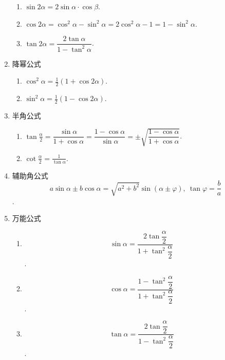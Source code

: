 \begin{enumerate}
	\begin{enumerate}
		\item \( \sin 2\alpha = 2\sin\alpha \cdot \cos \beta \).
		\item \( \cos2\alpha = \cos^{2}\alpha - \sin^{2}\alpha = 2\cos^{2}\alpha - 1 = 1 - \sin^{2}\alpha \).
		\item \( \displaystyle\tan2\alpha = \dfrac{2\tan\alpha}{1 - \tan^{2}\alpha} \).
	\end{enumerate}
	\item 降幂公式
	\begin{enumerate}
		\item \( \cos^{2}\alpha = \frac{1}{2}(1 + \cos2\alpha) \).
		\item \( \sin^{2}\alpha = \frac{1}{2}(1 - \cos2\alpha) \).
	\end{enumerate}
	\item 半角公式
	\begin{enumerate}
		\item \( \tan\frac{\alpha}{2} = \dfrac{\sin\alpha}{1 + \cos\alpha} = \dfrac{1 - \cos\alpha}{\sin\alpha} = \pm \sqrt{\dfrac{1 - \cos\alpha}{1 + \cos\alpha}} \).
		\item \( \displaystyle \cot\frac{\alpha}{2} = \frac{1}{\tan\alpha} \).
	\end{enumerate}
	\item 辅助角公式
	\[  a\sin\alpha \pm b\cos\alpha = \sqrt{a^{2} + b^{2}}\sin(\alpha \pm \varphi),\ \tan\varphi = \frac{b}{a}\].
	\item 万能公式
	\begin{enumerate}
		\item \[ \sin\alpha = \dfrac{2\tan\dfrac{\alpha}{2}}{1 + \tan^{2}\dfrac{\alpha}{2}} \].
		\item \[ \cos\alpha = \dfrac{1 - \tan^{2}\dfrac{\alpha}{2}}{1 + \tan^{2}\dfrac{\alpha}{2}} \].
		\item \[ \tan\alpha= \dfrac{2\tan\dfrac{\alpha}{2}}{1 - \tan^{2}\dfrac{\alpha}{2}}\].
	\end{enumerate}
\end{enumerate}
